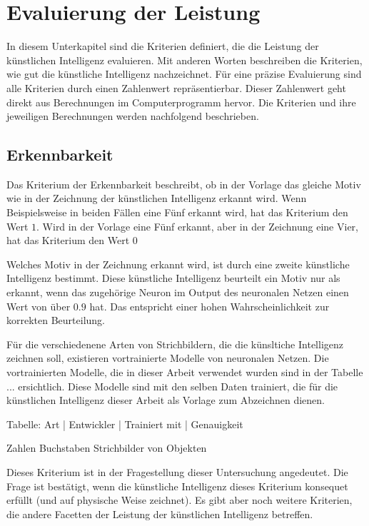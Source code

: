 \section{Evaluierung der Leistung}
In diesem Unterkapitel sind die Kriterien definiert, die die Leistung der
künstlichen Intelligenz evaluieren. Mit anderen Worten beschreiben die
Kriterien, wie gut die künstliche Intelligenz nachzeichnet. Für eine präzise
Evaluierung sind alle Kriterien durch einen Zahlenwert repräsentierbar. Dieser
Zahlenwert geht direkt aus Berechnungen im Computerprogramm hervor. Die
Kriterien und ihre jeweiligen Berechnungen werden nachfolgend beschrieben.

\subsection{Erkennbarkeit}
Das Kriterium der Erkennbarkeit beschreibt, ob in der Vorlage das gleiche Motiv
wie in der Zeichnung der künstlichen Intelligenz erkannt wird. Wenn
Beispielsweise in beiden Fällen eine Fünf erkannt wird, hat das Kriterium den
Wert $1$. Wird in der Vorlage eine Fünf erkannt, aber in der Zeichnung eine
Vier, hat das Kriterium den Wert $0$

Welches Motiv in der Zeichnung erkannt wird, ist durch eine zweite künstliche
Intelligenz bestimmt. Diese künstliche Intelligenz beurteilt ein Motiv nur als
erkannt, wenn das zugehörige Neuron im Output des neuronalen Netzen einen Wert
von über $0.9$ hat. Das entspricht einer hohen Wahrscheinlichkeit zur korrekten
Beurteilung.

Für die verschiedenene Arten von Strichbildern, die die künsltiche Intelligenz
zeichnen soll, existieren vortrainierte Modelle von neuronalen Netzen. Die
vortrainierten Modelle, die in dieser Arbeit verwendet wurden sind in der
Tabelle ... ersichtlich. Diese Modelle sind mit den selben Daten trainiert, die für
die künstlichen Intelligenz dieser Arbeit als Vorlage zum Abzeichnen dienen.

Tabelle:
Art       |       Entwickler      |     Trainiert mit     |      Genauigkeit 

Zahlen  
Buchstaben
Strichbilder von Objekten

Dieses Kriterium ist in der Fragestellung dieser Untersuchung angedeutet. Die
Frage ist bestätigt, wenn die künstliche Intelligenz dieses Kriterium konsequet
erfüllt (und auf physische Weise zeichnet). Es gibt aber noch weitere Kriterien,
die andere Facetten der Leistung der künstlichen Intelligenz betreffen.

